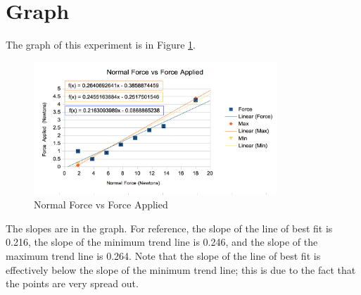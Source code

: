 \documentclass{chemlab}
\begin{document}
\hypertarget{graph}{%
\section{Graph}\label{graph}}

The graph of this experiment is in Figure \ref{fig:graph}.

\begin{figure}[H]

{\centering \includegraphics[height=5cm]{./images/graph} 

}

\caption{Normal Force vs Force Applied}\label{fig:graph}
\end{figure}

The slopes are in the graph. For reference, the slope of the line of
best fit is 0.216, the slope of the minimum trend line is 0.246, and the
slope of the maximum trend line is 0.264. Note that the slope of the
line of best fit is effectively below the slope of the minimum trend
line; this is due to the fact that the points are very spread out.
\end{document}
